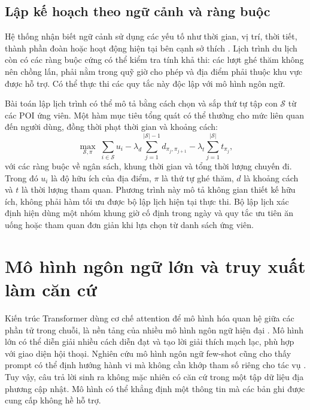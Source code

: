 \subsection{Lập kế hoạch theo ngữ cảnh và ràng buộc}

Hệ thống nhận biết ngữ cảnh sử dụng các yếu tố như thời gian, vị trí, thời tiết, thành phần đoàn hoặc hoạt động hiện tại bên cạnh sở thích \cite{gavalas2014mobile}. Lịch trình du lịch còn có các ràng buộc cứng có thể kiểm tra tính khả thi: các lượt ghé thăm không nên chồng lấn, phải nằm trong quỹ giờ cho phép và địa điểm phải thuộc khu vực được hỗ trợ. Có thể thực thi các quy tắc này độc lập với mô hình ngôn ngữ.

Bài toán lập lịch trình có thể mô tả bằng cách chọn và sắp thứ tự tập con $\mathcal{S}$ từ các POI ứng viên. Một hàm mục tiêu tổng quát có thể thưởng cho mức liên quan đến người dùng, đồng thời phạt thời gian và khoảng cách:
\begin{equation}
    \max_{\mathcal{S},\pi}\;
    \sum_{i\in\mathcal{S}} u_i
    - \lambda_d\sum_{j=1}^{|\mathcal{S}|-1} d_{\pi_j,\pi_{j+1}}
    - \lambda_t\sum_{j=1}^{|\mathcal{S}|} t_{\pi_j},
\end{equation}
với các ràng buộc về ngân sách, khung thời gian và tổng thời lượng chuyến đi. Trong đó $u_i$ là độ hữu ích của địa điểm, $\pi$ là thứ tự ghé thăm, $d$ là khoảng cách và $t$ là thời lượng tham quan. Phương trình này mô tả không gian thiết kế hữu ích, không phải hàm tối ưu được bộ lập lịch hiện tại thực thi. Bộ lập lịch xác định hiện dùng một nhóm khung giờ cố định trong ngày và quy tắc ưu tiên ăn uống hoặc tham quan đơn giản khi lựa chọn từ danh sách ứng viên.

\section{Mô hình ngôn ngữ lớn và truy xuất làm căn cứ}

Kiến trúc Transformer dùng cơ chế attention để mô hình hóa quan hệ giữa các phần tử trong chuỗi, là nền tảng của nhiều mô hình ngôn ngữ hiện đại \cite{vaswani2017attention}. Mô hình lớn có thể diễn giải nhiều cách diễn đạt và tạo lời giải thích mạch lạc, phù hợp với giao diện hội thoại. Nghiên cứu mô hình ngôn ngữ few-shot cũng cho thấy prompt có thể định hướng hành vi mà không cần khớp tham số riêng cho tác vụ \cite{brown2020language}. Tuy vậy, câu trả lời sinh ra không mặc nhiên có căn cứ trong một tập dữ liệu địa phương cập nhật. Mô hình có thể khẳng định một thông tin mà các bản ghi được cung cấp không hề hỗ trợ.

